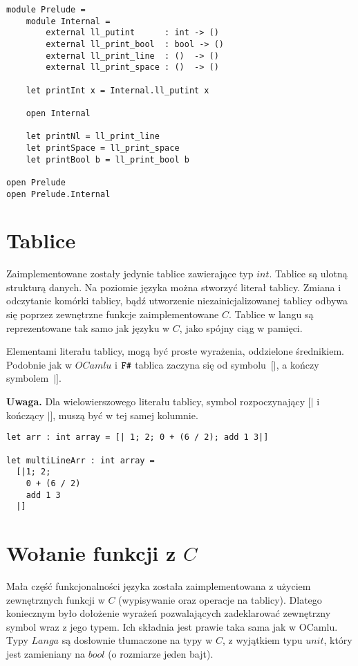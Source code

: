 \documentclass[declaration,shortabstract]{iithesis}
\begin{document}
\begin{lstlisting}[frame=single, caption=Tworzenie i importowanie modułów.]
module Prelude = 
    module Internal = 
        external ll_putint      : int -> () 
        external ll_print_bool  : bool -> () 
        external ll_print_line  : ()  -> () 
        external ll_print_space : ()  -> () 

    let printInt x = Internal.ll_putint x

    open Internal 
    
    let printNl = ll_print_line
    let printSpace = ll_print_space
    let printBool b = ll_print_bool b

open Prelude
open Prelude.Internal
\end{lstlisting}


\section{Tablice}

Zaimplementowane zostały jedynie tablice zawierające typ $int$. Tablice są 
ulotną strukturą danych. Na poziomie języka można stworzyć literał tablicy.
Zmiana i odczytanie komórki tablicy, bądź utworzenie niezainicjalizowanej tablicy odbywa się poprzez zewnętrzne funkcje zaimplementowane $C$. Tablice w 
langu są reprezentowane tak samo jak języku w $C$, jako spójny ciąg w pamięci.

Elementami literału tablicy, mogą być proste wyrażenia, oddzielone średnikiem. 
Podobnie jak w $OCamlu$ i $\verb!F#!$ tablica zaczyna się od symbolu~$[|$, a kończy symbolem~$|]$.

\textbf{Uwaga.} Dla wielowierszowego literału tablicy, symbol rozpoczynający 
$[|$ i kończący $|]$, muszą być w tej samej kolumnie.


\begin{lstlisting}[frame=single, caption=Tablice.]
let arr : int array = [| 1; 2; 0 + (6 / 2); add 1 3|]

let multiLineArr : int array = 
  [|1; 2;
    0 + (6 / 2)
    add 1 3
  |]
\end{lstlisting}

\section{Wołanie funkcji z $C$}

Mała część funkcjonalności języka została zaimplementowana z użyciem 
zewnętrznych funkcji w $C$ (wypisywanie oraz operacje na tablicy). Dlatego 
koniecznym było dołożenie wyrażeń pozwalających zadeklarować zewnętrzny symbol 
wraz z jego typem. Ich składnia jest prawie taka sama jak w OCamlu. Typy 
$Langa$ są dosłownie tłumaczone na typy w $C$, z wyjątkiem typu $unit$, który jest 
zamieniany na $bool$ (o rozmiarze jeden bajt).
\end{document}
